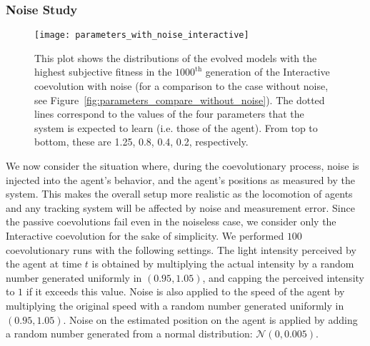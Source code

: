 \subsubsection{Noise Study}\label{sec:noise_study_deterministic_interaction}

\begin{figure}[!t]
		\centering
		\texttt{[image: parameters\_with\_noise\_interactive]}
		\caption{This plot shows the distributions of the evolved models with the highest subjective fitness in the $1000^\textrm{th}$ generation of the Interactive coevolution with noise (for a comparison to the case without noise, see Figure~\ref{fig:parameters_compare_without_noise}). The dotted lines correspond to the values of the four parameters that the system is expected to learn (i.e. those of the agent). From top to bottom, these are 1.25, 0.8, 0.4, 0.2, respectively. \label{fig:parameters_compare_with_noise}}
\end{figure}


We now consider the situation where, during the coevolutionary process, noise is injected into the agent's behavior, and the agent's positions as measured by the system. This makes the overall setup more realistic as the locomotion of agents and any tracking system will be affected by noise and measurement error. Since the passive coevolutions fail even in the noiseless case, we consider only the Interactive coevolution for the sake of simplicity. We performed $100$ coevolutionary runs with the following settings. The light intensity perceived by the agent at time $t$ is obtained by multiplying the actual intensity by a random number generated uniformly in $\left(0.95,1.05\right)$, and capping the perceived intensity to $1$ if it exceeds this value. Noise is also applied to the speed of the agent by multiplying the original speed with a random number generated uniformly in $\left(0.95,1.05\right)$. Noise on the estimated position on the agent is applied by adding a random number generated from a normal distribution: $\mathcal{N}\left(0,0.005\right)$. 

